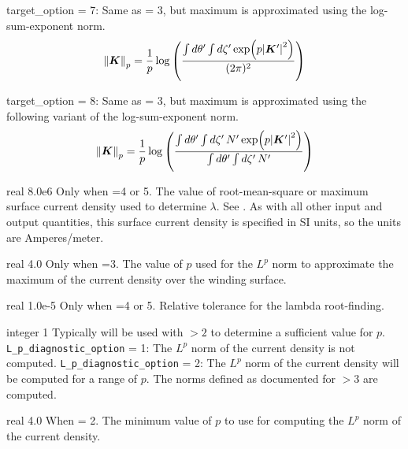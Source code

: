 {{\ttfamily target\_option} = 7: Same as  = 3, but maximum is approximated using the log-sum-exponent norm. 
\begin{gather}
\norm{\bm{K}}_p = \frac{1}{p} \log\left( \frac{\int d \theta' \int d \zeta'  \exp (p \abs{\bm{K}'}^2 ) }{ (2 \pi)^2}\right)
\end{gather}

{\ttfamily target\_option} = 8: Same as  = 3, but maximum is approximated using the following variant of the log-sum-exponent norm.
\begin{gather}
\norm{\bm{K}}_p = \frac{1}{p} \log \left( \frac{\int d \theta' \int d \zeta' \, N' \exp (p \abs{\bm{K}'}^2 ) }{ \int d \theta' \int d \zeta' \, N' }\right)
\end{gather}
}


\myhrule

{real}
{8.0e6}
{Only when =4 or 5.}
{The value of root-mean-square or maximum surface current density used to determine $\lambda$.
See .
As with all other input and output quantities, this surface current density is specified in SI units,
so the units are Amperes/meter.
}

\myhrule

{real}
{4.0}
{Only when =3.}
{The value of $p$ used for the $L^p$ norm to approximate the maximum of the current density over the
winding surface.}

\myhrule

{real}
{1.0e-5}
{Only when =4 or 5.}
{Relative tolerance for the lambda root-finding.}

\myhrule

{integer}
{1}
{Typically will be used with  $> 2$ to determine a sufficient value for $p$.}
{
\texttt{L\_p\_diagnostic\_option} = 1: The $L^p$ norm of the current density is not computed. 
\texttt{L\_p\_diagnostic\_option} = 2: The $L^p$ norm of the current density will be computed
for a range of $p$. The norms defined as documented for  $> 3$ are computed. 
}

\myhrule

{real}
{4.0}
{When  = 2.}
{
The minimum value of $p$ to use for computing the $L^p$ norm of the current density.
}

